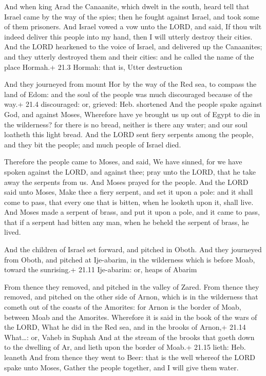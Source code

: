  And when king Arad the Canaanite, which dwelt in the south,
heard tell that Israel came by the way of the spies; then he fought
against Israel, and took some of them prisoners.  And Israel
vowed a vow unto the LORD, and said, If thou wilt indeed deliver this
people into my hand, then I will utterly destroy their cities.
 And the LORD hearkened to the voice of Israel, and
delivered up the Canaanites; and they utterly destroyed them and their
cities: and he called the name of the place Hormah.+ 21.3 Hormah: that
is, Utter destruction

 And they journeyed from mount Hor by the way of the Red
sea, to compass the land of Edom: and the soul of the people was much
discouraged because of the way.+ 21.4 discouraged: or, grieved: Heb.
shortened  And the people spake against God, and against
Moses, Wherefore have ye brought us up out of Egypt to die in the
wilderness? for there is no bread, neither is there any water; and our
soul loatheth this light bread.  And the LORD sent fiery
serpents among the people, and they bit the people; and much people of
Israel died.

 Therefore the people came to Moses, and said, We have
sinned, for we have spoken against the LORD, and against thee; pray unto
the LORD, that he take away the serpents from us. And Moses prayed for
the people.  And the LORD said unto Moses, Make thee a fiery
serpent, and set it upon a pole: and it shall come to pass, that every
one that is bitten, when he looketh upon it, shall live. 
And Moses made a serpent of brass, and put it upon a pole, and it came
to pass, that if a serpent had bitten any man, when he beheld the
serpent of brass, he lived.

 And the children of Israel set forward, and pitched in
Oboth.  And they journeyed from Oboth, and pitched at
Ije-abarim, in the wilderness which is before Moab, toward the
sunrising.+ 21.11 Ije-abarim: or, heaps of Abarim

 From thence they removed, and pitched in the valley of
Zared.  From thence they removed, and pitched on the other
side of Arnon, which is in the wilderness that cometh out of the coasts
of the Amorites: for Arnon is the border of Moab, between Moab and the
Amorites.  Wherefore it is said in the book of the wars of
the LORD, What he did in the Red sea, and in the brooks of Arnon,+ 21.14
What\ldots: or, Vaheb in Suphah  And at the stream of the
brooks that goeth down to the dwelling of Ar, and lieth upon the border
of Moab.+ 21.15 lieth: Heb. leaneth  And from thence they
went to Beer: that is the well whereof the LORD spake unto Moses, Gather
the people together, and I will give them water.

